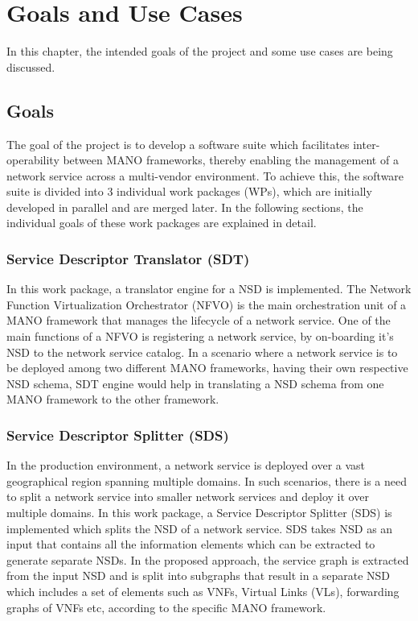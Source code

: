 \chapter{Goals and Use Cases}
\label{ch:Goals and Use Cases}

In this chapter, the intended goals of the project and some use cases are being discussed.

\section{Goals}

The goal of the project is to develop a software suite which facilitates inter-operability between MANO frameworks, thereby enabling the management of a network service across a multi-vendor environment. To achieve this, the software suite is divided into 3 individual work packages (WPs), which are initially developed in parallel and are merged later. In the following sections, the individual goals of these work packages are explained in detail.

\subsection{Service Descriptor Translator (SDT)}

In this work package, a translator engine for a NSD is implemented. The Network Function Virtualization Orchestrator (NFVO) is the main orchestration unit of a MANO framework that manages the lifecycle of a network service. One of the main functions of a NFVO is registering a network service, by on-boarding it's NSD to the network service catalog. In a scenario where a network service is to be deployed among two different MANO
frameworks, having their own respective NSD schema, SDT engine would help in translating a NSD schema from one MANO framework to the other framework. 
\subsection{Service Descriptor Splitter (SDS)}

In the production environment, a network service is deployed over a vast geographical region spanning multiple domains. In such scenarios, there is a need to split a network service into smaller network services and deploy it over multiple domains. In this work package, a Service Descriptor Splitter (SDS) is implemented which splits the NSD of a network service. SDS takes NSD as an input that contains all the information elements which can be extracted to generate separate NSDs. In the proposed approach, the service graph is extracted from the input NSD and is split into subgraphs that result in a separate NSD which includes a set of elements such as VNFs, Virtual Links (VLs), forwarding graphs of VNFs etc, according to the specific MANO framework.

